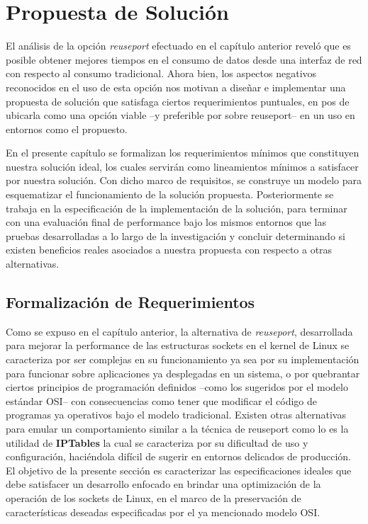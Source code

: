 \chapter{Propuesta de Solución}
El análisis de la opción \emph{reuseport} efectuado en el capítulo anterior reveló que es posible obtener mejores tiempos en el consumo de datos desde una interfaz de red con respecto al consumo tradicional. Ahora bien, los aspectos negativos reconocidos en el uso de esta opción nos motivan a diseñar e implementar una propuesta de solución que satisfaga ciertos requerimientos puntuales, en pos de ubicarla como una opción viable --y preferible por sobre reuseport-- en un uso en entornos como el propuesto.

En el presente capítulo se formalizan los requerimientos mínimos que constituyen nuestra solución ideal, los cuales servirán como lineamientos mínimos a satisfacer por nuestra solución. Con dicho marco de requisitos, se construye un modelo para esquematizar el funcionamiento de la solución propuesta. Posteriormente se trabaja en la especificación de la implementación de la solución, para terminar con una evaluación final de performance bajo los mismos entornos que las pruebas desarrolladas a lo largo de la investigación y concluir determinando si existen beneficios reales asociados a nuestra propuesta con respecto a otras alternativas.

\section{Formalización de Requerimientos}
Como se expuso en el capítulo anterior, la alternativa de \emph{reuseport}, desarrollada para mejorar la performance de las estructuras sockets en el kernel de Linux se caracteriza por ser complejas en su funcionamiento ya sea por su implementación para funcionar sobre aplicaciones ya desplegadas en un sistema, o por quebrantar ciertos principios de programación definidos --como los sugeridos por el modelo estándar OSI-- con consecuencias como tener que modificar el código de programas ya operativos bajo el modelo tradicional. Existen otras alternativas para emular un comportamiento similar a la técnica de reuseport como lo es la utilidad de \textbf{IPTables} \cite{book:iptables} la cual se caracteriza por su dificultad de uso y configuración, haciéndola difícil de sugerir en entornos delicados de producción. El objetivo de la presente sección es caracterizar las especificaciones ideales que debe satisfacer un desarrollo enfocado en brindar una optimización de la operación de los sockets de Linux, en el marco de la preservación de características deseadas especificadas por el ya mencionado modelo OSI.

